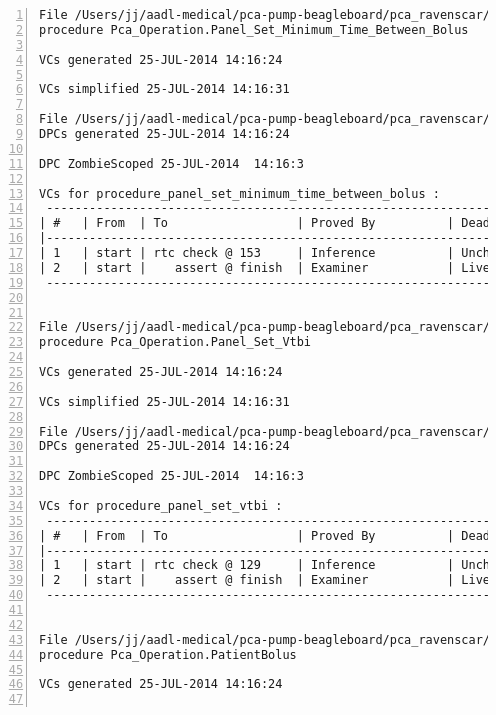 \begin{lstlisting}[gobble=0, numbers=left, caption={POGS report for PCA Pump prototype}, label={listing:pca_ravenscar:pogs_full}]
File /Users/jj/aadl-medical/pca-pump-beagleboard/pca_ravenscar/pca_operation/panel_set_minimum_time_between_bolus.vcg
procedure Pca_Operation.Panel_Set_Minimum_Time_Between_Bolus

VCs generated 25-JUL-2014 14:16:24

VCs simplified 25-JUL-2014 14:16:31

File /Users/jj/aadl-medical/pca-pump-beagleboard/pca_ravenscar/pca_operation/panel_set_minimum_time_between_bolus.dpc
DPCs generated 25-JUL-2014 14:16:24

DPC ZombieScoped 25-JUL-2014  14:16:3

VCs for procedure_panel_set_minimum_time_between_bolus :
 -----------------------------------------------------------------------------
| #   | From  | To                  | Proved By          | Dead Path | Status |
|-----------------------------------------------------------------------------
| 1   | start | rtc check @ 153     | Inference          | Unchecked |   IU   |
| 2   | start |    assert @ finish  | Examiner           | Live      |   EL   |
 -----------------------------------------------------------------------------


File /Users/jj/aadl-medical/pca-pump-beagleboard/pca_ravenscar/pca_operation/panel_set_vtbi.vcg
procedure Pca_Operation.Panel_Set_Vtbi

VCs generated 25-JUL-2014 14:16:24

VCs simplified 25-JUL-2014 14:16:31

File /Users/jj/aadl-medical/pca-pump-beagleboard/pca_ravenscar/pca_operation/panel_set_vtbi.dpc
DPCs generated 25-JUL-2014 14:16:24

DPC ZombieScoped 25-JUL-2014  14:16:3

VCs for procedure_panel_set_vtbi :
 -----------------------------------------------------------------------------
| #   | From  | To                  | Proved By          | Dead Path | Status |
|-----------------------------------------------------------------------------
| 1   | start | rtc check @ 129     | Inference          | Unchecked |   IU   |
| 2   | start |    assert @ finish  | Examiner           | Live      |   EL   |
 -----------------------------------------------------------------------------


File /Users/jj/aadl-medical/pca-pump-beagleboard/pca_ravenscar/pca_operation/patientbolus.vcg
procedure Pca_Operation.PatientBolus

VCs generated 25-JUL-2014 14:16:24


\end{lstlisting}

